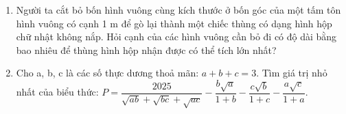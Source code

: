 \begin{ex}
	\begin{enumerate}
		\item[a)] Người ta cắt bỏ bốn hình vuông cùng kích thước ở bốn góc của một tấm tôn hình vuông có cạnh 1 m để gò lại thành một chiếc thùng có dạng hình hộp chữ nhật không nắp. Hỏi cạnh của các hình vuông cần bỏ đi có độ dài bằng bao nhiêu để thùng hình hộp nhận được có thể tích lớn nhất?
		\item[b)] Cho a, b, c là các số thực dương thoả mãn: $a+b+c=3$.
		Tìm giá trị nhỏ nhất của biểu thức: $P = \dfrac{2025}{\sqrt{ab}+\sqrt{bc}+\sqrt{ac}} - \dfrac{b\sqrt{a}}{1+b} - \dfrac{c\sqrt{b}}{1+c} - \dfrac{a\sqrt{c}}{1+a}$.
	\end{enumerate}
\end{ex}

